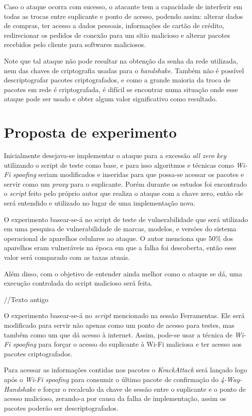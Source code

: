 \documentclass[12pt]{article}
\begin{document}
Caso o ataque ocorra com sucesso, o atacante tem a capacidade de interferir em todas as trocas entre suplicante e ponto de acesso, podendo assim: alterar dados de compras, ter acesso a dados pessoais, informações de cartão de crédito, redirecionar os pedidos de conexão para um sítio malicioso e alterar pacotes recebidos pelo cliente para softwares maliciosos. 

Note que tal ataque não pode resultar na obtenção da senha da rede utilizada, nem das chaves de criptografia usadas para o \textit{handshake}. Também não é possível descriptografar pacotes  criptografados, e como a grande maioria da troca de pacotes em rede é criptografada, é difícil se encontrar numa situação onde esse ataque pode ser usado e obter algum valor significativo como resultado.


\section{Proposta de experimento}
Inicialmente desejava-se implementar o ataque para a excessão \textit{all zero key} utilizando o script de teste como base, e para isso algoritmos e técnicas como \textit{Wi-Fi spoofing} seriam modificados e inseridas para que possa-se acessar os pacotes e servir como um \textit{proxy} para o suplicante. Porém durante os estudos foi encontrado o \textit{script} feito pelo próprio autor que realiza o ataque com a chave zero, então ele será entendido e utilizado no lugar de uma implementação nova.  

O experimento basear-se-á no script de teste de vulnerabilidade que será utilizado em uma pesquisa de vulnerabilidade de marcas, modelos, e versões do sistema operacional de aparelhos celulares ao ataque. O autor menciona que 50\% dos aparelhos eram vulneráveis na época em que a falha foi descoberta, então esse valor será comparado com as taxas atuais.

Além disso, com o objetivo de entender ainda melhor como o ataque se dá, uma execução controlada do script malicioso será feita. 

//Texto antigo

O experimento basear-se-á no \textit{script} mencionado na sessão Ferramentas. Ele será modificado para servir não apenas como um ponto de acesso para testes, mas também como um que dá acesso à internet. Assim, pode-se usar a técnica de \textit{Wi-Fi spoofing} para forçar o acesso do suplicante à Wi-Fi maliciosa e ter acesso aos pacotes criptografados.

Para acessar as informações contidas nos pacotes o \textit{KrackAttack} será lançado logo após o \textit{Wi-Fi spoofing} para consumir o último pacote de confirmação do \textit{4-Way-Handshake} e forçar o recalculo da chave de sessão entre o suplicante e o ponto de acesso malicioso, zerando-a por causa da falha de implementação, assim os pacotes poderão ser descriptografados.
\end{document}
